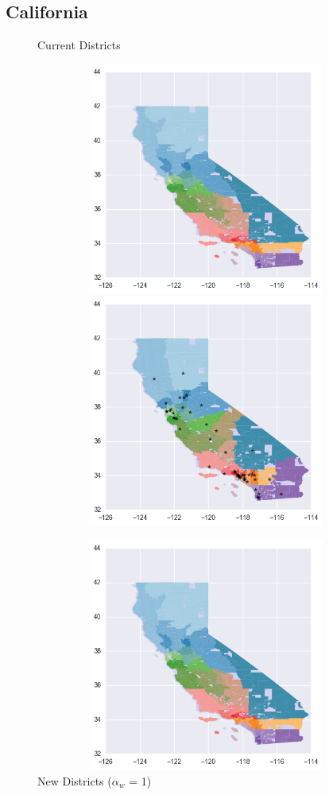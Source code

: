\clearpage
\newpage

\subsection{California}
\begin{figure}[htb!] \centering
\caption{ Current Districts }
\includegraphics[width=5in,height=3in,keepaspectratio]{../maps/CA/static/before.png}
\includegraphics[width=5in,height=3in,keepaspectratio]{../maps/CA/static/0_0_after.png}
\caption{ New Districts ($\alpha_w$ = 1) }
\includegraphics[width=5in,height=3in,keepaspectratio]{../maps/CA/static/before.png}

\end{figure}

